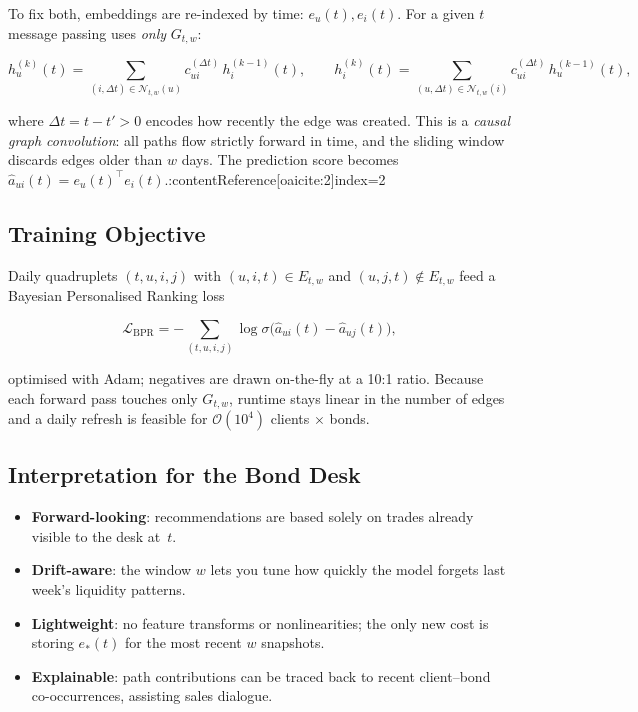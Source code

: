 \documentclass{article}
\begin{document}
To fix both, embeddings are re-indexed by time: $e_u(t),e_i(t)$.  For
a given $t$ message passing uses {\em only} $G_{t,w}$:

\[
h^{(k)}_u(t)=
\!\!\sum_{(i,\Delta t)\in\mathcal N_{t,w}(u)}\!\!
c^{(\Delta t)}_{ui}\,h^{(k-1)}_i(t),
\qquad
h^{(k)}_i(t)=
\!\!\sum_{(u,\Delta t)\in\mathcal N_{t,w}(i)}\!\!
c^{(\Delta t)}_{ui}\,h^{(k-1)}_u(t),
\]

where $\Delta t=t-t'>0$ encodes how recently the edge was created.
This is a {\em causal graph convolution}: all paths flow strictly
forward in time, and the sliding window discards edges older than
$w$ days.  The prediction score becomes
$\hat a_{ui}(t)=e_u(t)^{\!\top}e_i(t)$.:contentReference[oaicite:2]{index=2}

\subsection*{Training Objective}

Daily quadruplets $(t,u,i,j)$ with
$(u,i,t)\in E_{t,w}$ and $(u,j,t)\notin E_{t,w}$ feed a
Bayesian Personalised Ranking loss

\[
\mathcal L_{\text{BPR}}
   =-\sum_{(t,u,i,j)}
     \log\sigma\bigl(\hat a_{ui}(t)-\hat a_{uj}(t)\bigr),
\]

optimised with Adam; negatives are drawn on-the-fly at a 10:1
ratio.  Because each forward pass touches only $G_{t,w}$, runtime
stays linear in the number of edges and a daily refresh is feasible
for $\mathcal O(10^4)$ clients $\times$ bonds.

\subsection*{Interpretation for the Bond Desk}

\begin{itemize}
  \item {\bf Forward-looking}: recommendations are based solely on
        trades already visible to the desk at~$t$.
  \item {\bf Drift-aware}: the window $w$ lets you tune how quickly the
        model forgets last week’s liquidity patterns.
  \item {\bf Lightweight}: no feature transforms or nonlinearities;
        the only new cost is storing $e_\ast(t)$ for the most recent
        $w$ snapshots.
  \item {\bf Explainable}: path contributions can be traced back to
        recent client–bond co-occurrences, assisting sales dialogue.
\end{itemize}
\end{document}
